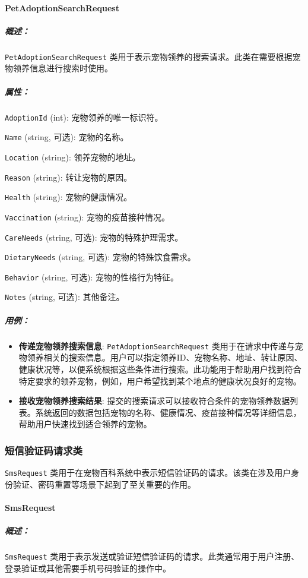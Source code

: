 \paragraph{PetAdoptionSearchRequest}
\subparagraph{概述：} \texttt{PetAdoptionSearchRequest} 类用于表示宠物领养的搜索请求。此类在需要根据宠物领养信息进行搜索时使用。

\subparagraph{属性：}

\texttt{AdoptionId} (int): 宠物领养的唯一标识符。

\texttt{Name} (string, 可选): 宠物的名称。

\texttt{Location} (string): 领养宠物的地址。

\texttt{Reason} (string): 转让宠物的原因。

\texttt{Health} (string): 宠物的健康情况。

\texttt{Vaccination} (string): 宠物的疫苗接种情况。

\texttt{CareNeeds} (string, 可选): 宠物的特殊护理需求。

\texttt{DietaryNeeds} (string, 可选): 宠物的特殊饮食需求。

\texttt{Behavior} (string, 可选): 宠物的性格行为特征。

\texttt{Notes} (string, 可选): 其他备注。

\subparagraph{用例：}
\begin{itemize}
	\item \textbf{传递宠物领养搜索信息}: \texttt{PetAdoptionSearchRequest} 类用于在请求中传递与宠物领养相关的搜索信息。用户可以指定领养ID、宠物名称、地址、转让原因、健康状况等，以便系统根据这些条件进行搜索。此功能用于帮助用户找到符合特定要求的领养宠物，例如，用户希望找到某个地点的健康状况良好的宠物。
	\item \textbf{接收宠物领养搜索结果}: 提交的搜索请求可以接收符合条件的宠物领养数据列表。系统返回的数据包括宠物的名称、健康情况、疫苗接种情况等详细信息，帮助用户快速找到适合领养的宠物。
\end{itemize}

\subsubsection{短信验证码请求类}

\texttt{SmsRequest} 类用于在宠物百科系统中表示短信验证码的请求。该类在涉及用户身份验证、密码重置等场景下起到了至关重要的作用。

\paragraph{SmsRequest}
\subparagraph{概述：} \texttt{SmsRequest} 类用于表示发送或验证短信验证码的请求。此类通常用于用户注册、登录验证或其他需要手机号码验证的操作中。

